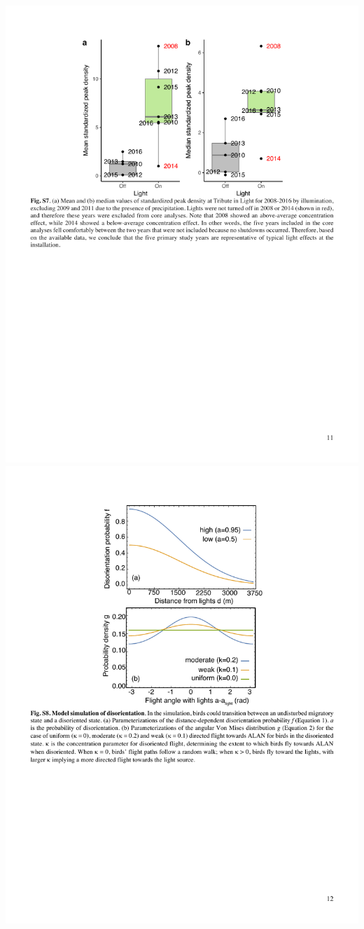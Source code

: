 \documentclass[a4paper, twoside]{templates/ociamthesis}
\begin{document}
\includegraphics[width=1\linewidth]{pdf_chapters/lights/lights_supp_crop_Part15}
\includegraphics[width=1\linewidth]{pdf_chapters/lights/lights_supp_crop_Part16}
\end{document}
